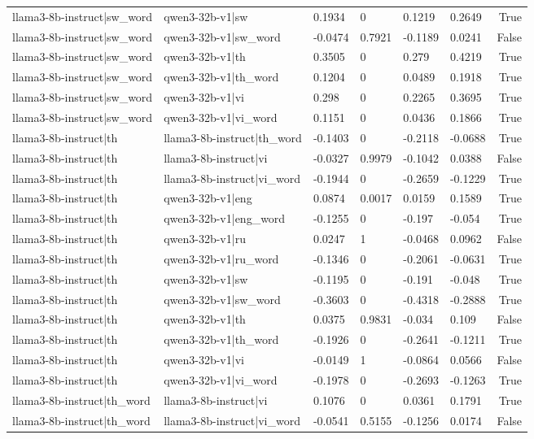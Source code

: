 \begin{table}
\begin{tabular}{llllllr}
llama3-8b-instruct|sw_word & qwen3-32b-v1|sw & 0.1934 & 0 & 0.1219 & 0.2649 & True \\
llama3-8b-instruct|sw_word & qwen3-32b-v1|sw_word & -0.0474 & 0.7921 & -0.1189 & 0.0241 & False \\
llama3-8b-instruct|sw_word & qwen3-32b-v1|th & 0.3505 & 0 & 0.279 & 0.4219 & True \\
llama3-8b-instruct|sw_word & qwen3-32b-v1|th_word & 0.1204 & 0 & 0.0489 & 0.1918 & True \\
llama3-8b-instruct|sw_word & qwen3-32b-v1|vi & 0.298 & 0 & 0.2265 & 0.3695 & True \\
llama3-8b-instruct|sw_word & qwen3-32b-v1|vi_word & 0.1151 & 0 & 0.0436 & 0.1866 & True \\
llama3-8b-instruct|th & llama3-8b-instruct|th_word & -0.1403 & 0 & -0.2118 & -0.0688 & True \\
llama3-8b-instruct|th & llama3-8b-instruct|vi & -0.0327 & 0.9979 & -0.1042 & 0.0388 & False \\
llama3-8b-instruct|th & llama3-8b-instruct|vi_word & -0.1944 & 0 & -0.2659 & -0.1229 & True \\
llama3-8b-instruct|th & qwen3-32b-v1|eng & 0.0874 & 0.0017 & 0.0159 & 0.1589 & True \\
llama3-8b-instruct|th & qwen3-32b-v1|eng_word & -0.1255 & 0 & -0.197 & -0.054 & True \\
llama3-8b-instruct|th & qwen3-32b-v1|ru & 0.0247 & 1 & -0.0468 & 0.0962 & False \\
llama3-8b-instruct|th & qwen3-32b-v1|ru_word & -0.1346 & 0 & -0.2061 & -0.0631 & True \\
llama3-8b-instruct|th & qwen3-32b-v1|sw & -0.1195 & 0 & -0.191 & -0.048 & True \\
llama3-8b-instruct|th & qwen3-32b-v1|sw_word & -0.3603 & 0 & -0.4318 & -0.2888 & True \\
llama3-8b-instruct|th & qwen3-32b-v1|th & 0.0375 & 0.9831 & -0.034 & 0.109 & False \\
llama3-8b-instruct|th & qwen3-32b-v1|th_word & -0.1926 & 0 & -0.2641 & -0.1211 & True \\
llama3-8b-instruct|th & qwen3-32b-v1|vi & -0.0149 & 1 & -0.0864 & 0.0566 & False \\
llama3-8b-instruct|th & qwen3-32b-v1|vi_word & -0.1978 & 0 & -0.2693 & -0.1263 & True \\
llama3-8b-instruct|th_word & llama3-8b-instruct|vi & 0.1076 & 0 & 0.0361 & 0.1791 & True \\
llama3-8b-instruct|th_word & llama3-8b-instruct|vi_word & -0.0541 & 0.5155 & -0.1256 & 0.0174 & False \\

\end{tabular}
\end{table}
